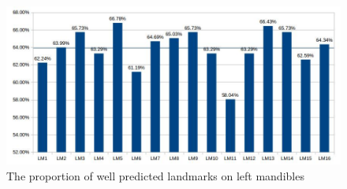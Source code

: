 \documentclass[12pt,a4paper]{article}
\begin{document}
\begin{figure}[h!]
	\centering
	\includegraphics[scale=0.55]{images/mg}
	\caption{The proportion of well predicted landmarks on left mandibles}
	\label{mgfig}
\end{figure}
\end{document}
